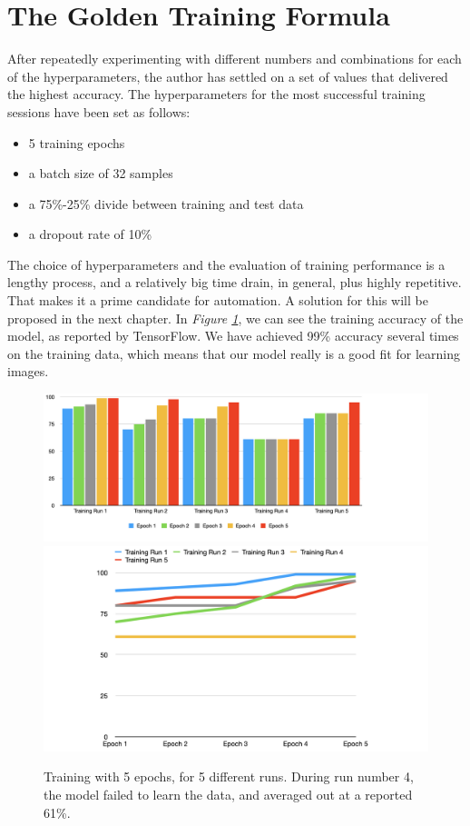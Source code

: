 \section{The Golden Training Formula}
After repeatedly experimenting with different numbers and combinations for each of the hyperparameters, the author has settled on a set of values that delivered the highest accuracy. The hyperparameters for the most successful training sessions have been set as follows: 
\begin{itemize}
    \item 5 training epochs
    \item a batch size of 32 samples
    \item a 75\%-25\% divide between training and test data
    \item a dropout rate of 10\%
\end{itemize}
The choice of hyperparameters and the evaluation of training performance is a lengthy process, and a relatively big time drain, in general, plus highly repetitive. That makes it a prime candidate for automation. A solution for this will be proposed in the next chapter. In \textit{Figure \ref{training_tf_gold}}, we can see the training accuracy of the model, as reported by TensorFlow. We have achieved 99\% accuracy several times on the training data, which means that our model really is a good fit for learning images. 

\begin{figure}
    \centering
    \includegraphics[width = 16 cm]{figures/training_fig1}
    \includegraphics[width = 16 cm]{figures/training_fig2}
    \caption{Training with 5 epochs, for 5 different runs. During run number 4, the model failed to learn the data, and averaged out at a reported 61\%.}
    \label{training_tf_gold}
\end{figure}

